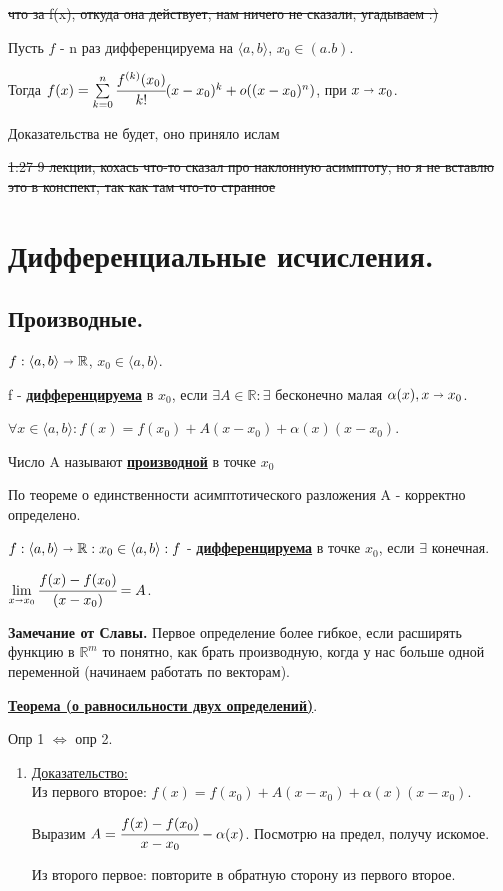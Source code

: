\documentclass{article}
\newcommand{\deff}[1]{\underline{\textbf{#1}}}
\newcommand{\thmm}[1]{\underline{\textbf{#1}}}
\newcommand{\prooff}[1]{{\underline{Доказательство:}} \\ }
\begin{document}
\sout{что за f(x), откуда она действует, нам ничего не сказали, угадываем :) }

Пусть $f$ - n раз дифференцируема на $\langle a,b\rangle$, $x_0 \in (a.b)$.

Тогда $f(x) = \sum\limits_{k=0}^n \cfrac{f^{(k)}(x_0)}{k!} (x-x_0)^k + o((x-x_0)^n)$, при $x\shortrightarrow x_0$.

Доказательства не будет, оно приняло ислам

\sout{1:27 9 лекции, кохась что-то сказал про наклонную  асимптоту, но я не вставлю это в конспект, так как там что-то странное}



\pagebreak
\section{Дифференциальные исчисления.}
\subsection{Производные.}
$f: \langle a,b\rangle \shortrightarrow \mathbb{R}$, $x_0 \in \langle a,b \rangle$.

f - \deff{дифференцируема} в $x_0$, если $\exists A\in \mathbb{R}: \exists$ бесконечно малая $\alpha(x), x\shortrightarrow x_0$.

$\forall x \in \langle a,b\rangle: f(x) = f(x_0) + A(x-x_0) + \alpha(x) (x-x_0)$.

Число A называют \deff{производной} в точке $x_0$

По теореме о единственности асимптотического разложения A - корректно определено.

$f:\langle a,b\rangle \shortrightarrow \mathbb{R}: x_0 \in \langle a,b\rangle: f$ - \deff{дифференцируема} в точке $x_0$, если $\exists$ конечная.

$\lim\limits_{x\shortrightarrow x_0}\cfrac{f(x)-f(x_0)}{(x-x_0)} = A$.

\textbf{Замечание от Славы.} Первое определение более гибкое, если расширять функцию в $\mathbb{R}^m$ то понятно, как брать производную, когда у нас больше одной переменной (начинаем работать по векторам).

\thmm{Теорема (о равносильности двух определений)}.

Опр 1 $\Leftrightarrow$ опр 2.

\begin{enumerate}
    \item[] \prooff{}
    Из первого второе: $f(x) = f(x_0)  + A(x-x_0) + \alpha(x)(x-x_0)$.

    Выразим $A = \cfrac{f(x)-f(x_0)}{x-x_0} - \alpha(x)$. Посмотрю на предел, получу искомое.

    Из второго первое: повторите в обратную сторону из первого второе.
\end{enumerate}
\end{document}
